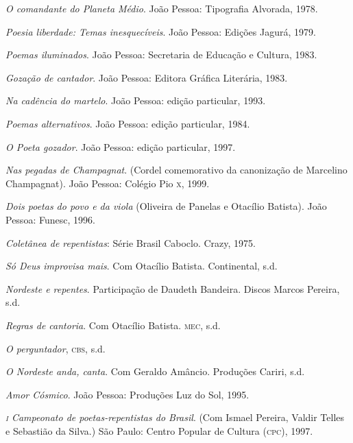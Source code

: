 \begin{bibliografia}[]


\bigskip
{}


\tit{}\textit{O comandante do Planeta Médio}. João Pessoa: Tipografia Alvorada, 1978.

\tit{}\textit{Poesia liberdade: Temas inesquecíveis}. João Pessoa: Edições Jagurá, 1979.

\tit{}\textit{Poemas iluminados}. João Pessoa: Secretaria de Educação e Cultura, 1983.

\tit{}\textit{Gozação de cantador}. João Pessoa: Editora Gráfica Literária, 1983.

\tit{}\textit{Na cadência do martelo}. João Pessoa: edição particular, 1993.

\tit{}\textit{Poemas alternativos}. João Pessoa: edição particular, 1984.

\tit{}\textit{O Poeta gozador}. João Pessoa: edição particular, 1997.

\tit{}\textit{Nas pegadas de Champagnat}. (Cordel comemorativo da canonização de Marcelino Champagnat). João Pessoa: Colégio
Pio \textsc{x}, 1999.

\tit{}\textit{Dois poetas do povo e da viola} (Oliveira de Panelas e Otacílio Batista). João Pessoa: Funesc, 1996.

\bigskip
{}


\tit{}\textit{Coletânea de repentistas}: Série Brasil Caboclo. Crazy, 1975.

\tit{}\textit{Só Deus improvisa mais}. Com Otacílio Batista. Continental, s.d.

\tit{}\textit{Nordeste e repentes}. Participação de Daudeth Bandeira. Discos Marcos Pereira, s.d.

\tit{}\textit{Regras de cantoria}. Com Otacílio Batista. \textsc{mec}, s.d.

\tit{}\textit{O perguntador}, \textsc{cbs}, s.d.

\tit{}\textit{O Nordeste anda, canta}. Com Geraldo Amâncio. Produções Cariri, s.d.


\bigskip
{}


\tit{}\textit{Amor Cósmico}. João Pessoa: Produções Luz do Sol, 1995.

\tit{}\textit{\textsc{i} Campeonato de poetas-repentistas do Brasil}. (Com Ismael Pereira, Valdir Telles e Sebastião da Silva.) São
Paulo: Centro Popular de Cultura (\textsc{cpc}), 1997.


\end{bibliografia}

